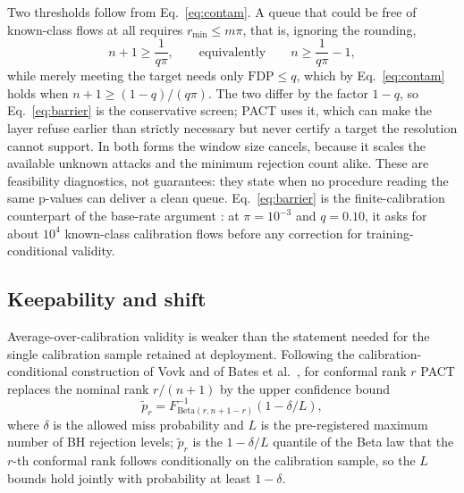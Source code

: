 \documentclass[a4paper,fleqn]{cas-dc}
\newcommand{\PACT}{PACT\xspace}
\newcommand{\FDP}{\mathrm{FDP}}
\begin{document}
Two thresholds follow from Eq.~\eqref{eq:contam}. A queue that could be free of known-class flows at all requires $r_{\min}\le m\pi$, that is, ignoring the rounding,
\begin{equation}
 n+1 \geq \frac{1}{q\pi}, \qquad\text{equivalently}\qquad n\geq \frac{1}{q\pi}-1,
\label{eq:barrier}
\end{equation}
while merely meeting the target needs only $\FDP\le q$, which by Eq.~\eqref{eq:contam} holds when $n+1\ge(1-q)/(q\pi)$. The two differ by the factor $1-q$, so Eq.~\eqref{eq:barrier} is the conservative screen; \PACT uses it, which can make the layer refuse earlier than strictly necessary but never certify a target the resolution cannot support. In both forms the window size cancels, because it scales the available unknown attacks and the minimum rejection count alike. These are feasibility diagnostics, not guarantees: they state when no procedure reading the same p-values can deliver a clean queue. Eq.~\eqref{eq:barrier} is the finite-calibration counterpart of the base-rate argument \cite{axelsson2000baserate}: at $\pi=10^{-3}$ and $q=0.10$, it asks for about $10^4$ known-class calibration flows before any correction for training-conditional validity.

\subsection{Keepability and shift}
Average-over-calibration validity is weaker than the statement needed for the single calibration sample retained at deployment. Following the calibration-conditional construction of Vovk and of Bates et al.\ \cite{vovk2012conditional,bates2023outliers}, for conformal rank $r$ \PACT replaces the nominal rank $r/(n+1)$ by the upper confidence bound
\begin{equation}
 \widetilde p_r=F^{-1}_{\mathrm{Beta}(r,n+1-r)}(1-\delta/L),
 \label{eq:conditionalp}
\end{equation}
where $\delta$ is the allowed miss probability and $L$ is the pre-registered maximum number of BH rejection levels; $\widetilde p_r$ is the $1-\delta/L$ quantile of the Beta law that the $r$-th conformal rank follows conditionally on the calibration sample, so the $L$ bounds hold jointly with probability at least $1-\delta$.
\end{document}

